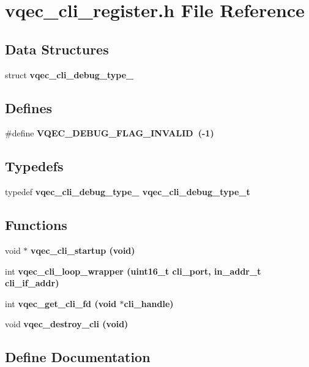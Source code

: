 \section{vqec\_\-cli\_\-register.h File Reference}
\label{vqec__cli__register_8h}
\subsection*{Data Structures}
\begin{CompactItemize}
\item 
struct \bf{vqec\_\-cli\_\-debug\_\-type\_\-}
\end{CompactItemize}
\subsection*{Defines}
\begin{CompactItemize}
\item 
\#define \bf{VQEC\_\-DEBUG\_\-FLAG\_\-INVALID}~(-1)
\end{CompactItemize}
\subsection*{Typedefs}
\begin{CompactItemize}
\item 
typedef \bf{vqec\_\-cli\_\-debug\_\-type\_\-} \bf{vqec\_\-cli\_\-debug\_\-type\_\-t}
\end{CompactItemize}
\subsection*{Functions}
\begin{CompactItemize}
\item 
void $\ast$ \bf{vqec\_\-cli\_\-startup} (void)
\item 
int \bf{vqec\_\-cli\_\-loop\_\-wrapper} (uint16\_\-t cli\_\-port, in\_\-addr\_\-t cli\_\-if\_\-addr)
\item 
int \bf{vqec\_\-get\_\-cli\_\-fd} (void $\ast$cli\_\-handle)
\item 
void \bf{vqec\_\-destroy\_\-cli} (void)
\end{CompactItemize}


\subsection{Define Documentation}

